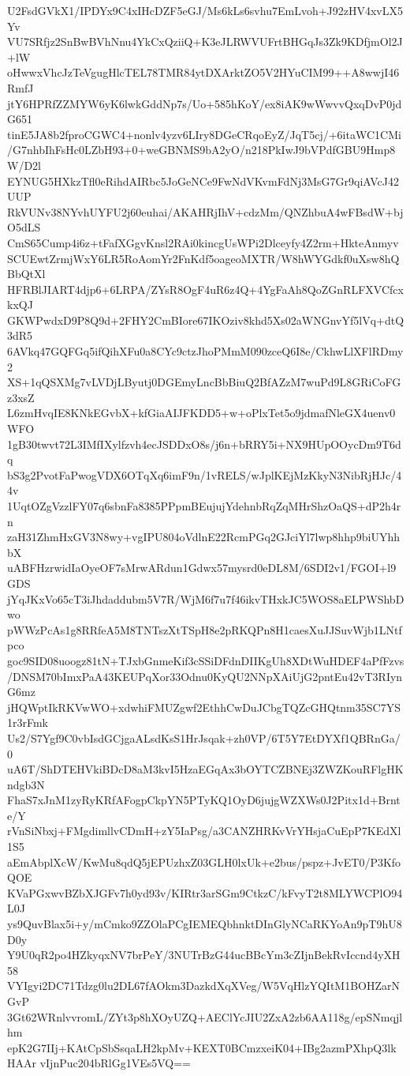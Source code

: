 U2FsdGVkX1/IPDYx9C4xIHcDZF5eGJ/Ms6kLs6svhu7EmLvoh+J92zHV4xvLX5Yv
VU7SRfjz2SnBwBVhNnu4YkCxQziiQ+K3eJLRWVUFrtBHGqJs3Zk9KDfjmOl2J+lW
oHwwxVhcJzTeVgugHlcTEL78TMR84ytDXArktZO5V2HYuCIM99++A8wwjI46RmfJ
jtY6HPRfZZMYW6yK6lwkGddNp7s/Uo+585hKoY/ex8iAK9wWwvvQxqDvP0jdG651
tinE5JA8b2fproCGWC4+nonlv4yzv6LIry8DGeCRqoEyZ/JqT5cj/+6itaWC1CMi
/G7nhbIhFsHc0LZbH93+0+weGBNMS9bA2yO/n218PkIwJ9bVPdfGBU9Hmp8W/D2l
EYNUG5HXkzTfl0eRihdAIRbc5JoGeNCe9FwNdVKvmFdNj3MsG7Gr9qiAVcJ42UUP
RkVUNv38NYvhUYFU2j60euhai/AKAHRjIhV+cdzMm/QNZhbuA4wFBsdW+bjO5dLS
CmS65Cump4i6z+tFafXGgvKnsl2RAi0kincgUsWPi2Dlceyfy4Z2rm+HkteAnmyv
SCUEwtZrmjWxY6LR5RoAomYr2FnKdf5oageoMXTR/W8hWYGdkf0uXsw8hQBbQtXl
HFRBlJIART4djp6+6LRPA/ZYsR8OgF4uR6z4Q+4YgFaAh8QoZGnRLFXVCfcxkxQJ
GKWPwdxD9P8Q9d+2FHY2CmBIore67IKOziv8khd5Xs02aWNGnvYf5lVq+dtQ3dR5
6AVkq47GQFGq5ifQihXFu0a8CYc9ctzJhoPMmM090zceQ6I8e/CkhwLlXFlRDmy2
XS+1qQSXMg7vLVDjLByutj0DGEmyLncBbBiuQ2BfAZzM7wuPd9L8GRiCoFGz3xsZ
L6zmHvqIE8KNkEGvbX+kfGiaAIJFKDD5+w+oPlxTet5o9jdmafNleGX4uenv0WFO
1gB30twvt72L3IMfIXylfzvh4ecJSDDxO8s/j6n+bRRY5i+NX9HUpOOycDm9T6dq
bS3g2PvotFaPwogVDX6OTqXq6imF9n/1vRELS/wJplKEjMzKkyN3NibRjHJc/44v
1UqtOZgVzzlFY07q6sbnFa8385PPpmBEujujYdehnbRqZqMHrShzOaQS+dP2h4rn
zaH31ZhmHxGV3N8wy+vgIPU804oVdlnE22RcmPGq2GJciYl7lwp8hhp9biUYhhbX
uABFHzrwidIaOyeOF7sMrwARdun1Gdwx57mysrd0eDL8M/6SDI2v1/FGOI+l9GDS
jYqJKxVo65cT3iJhdaddubm5V7R/WjM6f7u7f46ikvTHxkJC5WOS8aELPWShbDwo
pWWzPcAs1g8RRfeA5M8TNTszXtTSpH8e2pRKQPn8H1caesXuJJSuvWjb1LNtfpco
goc9SID08uoogz81tN+TJxbGnmeKif3cSSiDFdnDIIKgUh8XDtWuHDEF4aPfFzvs
/DNSM70bImxPaA43KEUPqXor33Odnu0KyQU2NNpXAiUjG2pntEu42vT3RIynG6mz
jHQWptIkRKVwWO+xdwhiFMUZgwf2EthhCwDuJCbgTQZcGHQtnm35SC7YS1r3rFmk
Us2/S7Ygf9C0vbIsdGCjgaALsdKsS1HrJsqak+zh0VP/6T5Y7EtDYXf1QBRnGa/0
uA6T/ShDTEHVkiBDcD8aM3kvI5HzaEGqAx3bOYTCZBNEj3ZWZKouRFlgHKndgb3N
FhaS7xJnM1zyRyKRfAFogpCkpYN5PTyKQ1OyD6jujgWZXWs0J2Pitx1d+Brnte/Y
rVnSiNbxj+FMgdimllvCDmH+zY5IaPsg/a3CANZHRKvVrYHsjaCuEpP7KEdXl1S5
aEmAbplXcW/KwMu8qdQ5jEPUzhxZ03GLH0lxUk+e2bus/pspz+JvET0/P3KfoQOE
KVaPGxwvBZbXJGFv7h0yd93v/KIRtr3arSGm9CtkzC/kFvyT2t8MLYWCPlO94L0J
ys9QuvBlax5i+y/mCmko9ZZOlaPCgIEMEQbhnktDInGlyNCaRKYoAn9pT9hU8D0y
Y9U0qR2po4HZkyqxNV7brPeY/3NUTrBzG44ucBBcYm3cZIjnBekRvIccnd4yXH58
VYIgyi2DC71Tdzg0lu2DL67fAOkm3DazkdXqXVeg/W5VqHlzYQItM1BOHZarNGvP
3Gt62WRnlvvromL/ZYt3p8hXOyUZQ+AEClYcJIU2ZxA2zb6AA118g/epSNmqjlhm
epK2G7IIj+KAtCpSbSsqaLH2kpMv+KEXT0BCmzxeiK04+IBg2azmPXhpQ3lkHAAr
vIjnPuc204bRlGg1VEs5VQ==
